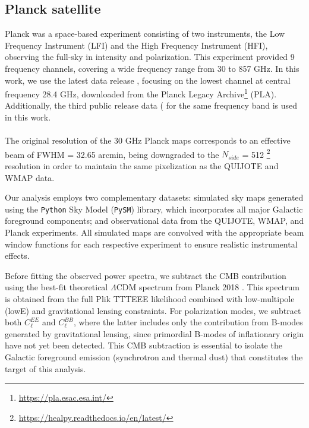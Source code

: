 \subsection{Planck satellite} 

Planck was a space-based experiment consisting of two instruments, the Low Frequency Instrument (LFI) and the High Frequency Instrument (HFI), observing the  full-sky in intensity and polarization. This experiment provided 9 frequency channels, covering a wide frequency range from 30 to 857 GHz. In this work, we use the latest data release , focusing on the lowest channel at central frequency 28.4 GHz, downloaded from the Planck Legacy Archive\footnote{\url{https://pla.esac.esa.int/}} (PLA). Additionally, the third public release data ( for the same frequency band is used in this work.
\paragraph*{}

The original resolution of the 30 GHz Planck maps corresponds to an effective beam of FWHM = 32.65 arcmin, being downgraded to the $N_{side}$ = 512 \footnote{\url{https://healpy.readthedocs.io/en/latest/}} resolution in order to maintain the same pixelization as the QUIJOTE and WMAP data. 



Our analysis employs two complementary datasets: simulated sky maps generated using the \texttt{Python} Sky Model (\texttt{PySM}) library, which incorporates all major Galactic foreground components; and observational data from the QUIJOTE, WMAP, and Planck experiments. All simulated maps are convolved with the appropriate beam window functions for each respective experiment to ensure realistic instrumental effects.


Before fitting the observed power spectra, we subtract the CMB contribution using the best-fit theoretical $\Lambda$CDM spectrum from Planck 2018 \citep{Planck_2018vi}. This spectrum is obtained from the full Plik TTTEEE likelihood combined with low-multipole (lowE) and gravitational lensing constraints. For polarization modes, we subtract both $C_\ell^{EE}$ and $C_\ell^{BB}$, where the latter includes only the contribution from B-modes generated by gravitational lensing, since primordial B-modes of inflationary origin have not yet been detected. This CMB subtraction is essential to isolate the Galactic foreground emission (synchrotron and thermal dust) that constitutes the target of this analysis.

